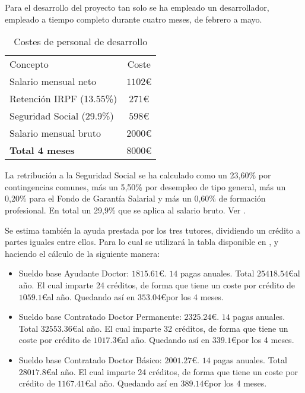 Para el desarrollo del proyecto tan solo se ha empleado un desarrollador, empleado a tiempo completo durante cuatro meses, de febrero a mayo.

\begin{table}[H]
	\begin{center}
		\begin{tabular}{l  c}\hline
			\toprule
			Concepto & Coste\\
			\otoprule
			Salario mensual neto & $1102 $\euro\\
			Retención IRPF (13.55\%)  & $271 $\euro\\
			Seguridad Social (29.9\%)& $598 $\euro\\
			Salario mensual bruto & $2000 $\euro\\
			\hline
			\textbf{Total 4 meses} & $8000 $\euro\\
			\bottomrule
		\end{tabular}
		\caption{Costes de personal de desarrollo}
		\label{tb:costesPersonal}
	\end{center}
\end{table}

La retribución a la Seguridad Social se ha calculado como un 23,60\% por contingencias comunes, más un 5,50\% por desempleo de tipo general, más un 0,20\% para el Fondo de Garantía Salarial y más un 0,60\% de formación profesional. En total un 29,9\% que se aplica al salario bruto. Ver \citep{wiki:basesCot18}.

Se estima también la ayuda prestada por los tres tutores, dividiendo un crédito a partes iguales entre ellos. Para lo cual se utilizará la tabla disponible en \citep{wiki:ubupdiwages}, y haciendo el cálculo de la siguiente manera: 

\begin{itemize}
\item Sueldo base Ayudante Doctor: $1815.61$\euro. $14$ pagas anuales. Total $25418.54$\euro  al año. El cual imparte 24 créditos, de forma que tiene un coste por crédito de $1059.1$\euro  al año. Quedando así en $353.04$\euro por los 4 meses.
\item Sueldo base Contratado Doctor Permanente: $2325.24$\euro. $14$ pagas anuales. Total $32553.36$\euro   al año. El cual imparte 32 créditos, de forma que tiene un coste por crédito de $1017.3$\euro  al año. Quedando así en $339.1$\euro por los 4 meses.
\item Sueldo base Contratado Doctor Básico: $2001.27$\euro. $14$ pagas anuales. Total $28017.8$\euro  al año. El cual imparte 24 créditos, de forma que tiene un coste por crédito de $1167.41$\euro  al año. Quedando así en $389.14$\euro por los 4 meses.
\end{itemize}


